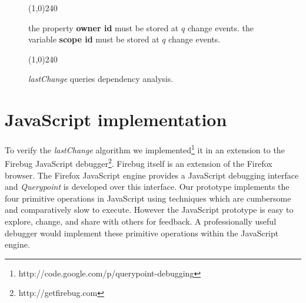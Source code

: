 \documentclass{sig-alternate}
\begin{document}
\begin{figure}[htp]
\line(1,0){240}
\begin{algorithmic}%
     \STATE the property {\bf owner id} must be stored at $q$ change events. 
     \STATE the variable {\bf scope id} must be stored at $q$ change events.
	 \ENDIF 
 \ENDFOR 
\ENDFOR

\end{algorithmic}
\line(1,0){240}
\caption{\textit{lastChange} queries dependency analysis.}
\label{fig:dependency-analysis}
\end{figure}
\section{JavaScript implementation}
To verify the \textit{lastChange} algorithm we
implemented\footnote[1]{http://code.google.com/p/querypoint-debugging} it in an extension to the Firebug
JavaScript debugger\footnote[2]{http://getfirebug.com}. %
Firebug itself is an extension of the Firefox browser. %
The Firefox JavaScript engine provides a JavaScript debugging interface \cite{JSD} and 
\textit{Querypoint} is developed over this interface. Our prototype implements the four primitive operations in JavaScript 
using techniques which are cumbersome and comparatively slow to execute. However the JavaScript prototype is
easy to explore, change, and share with others for feedback. A professionally useful debugger 
would implement these primitive operations within the JavaScript engine.
\end{document}
